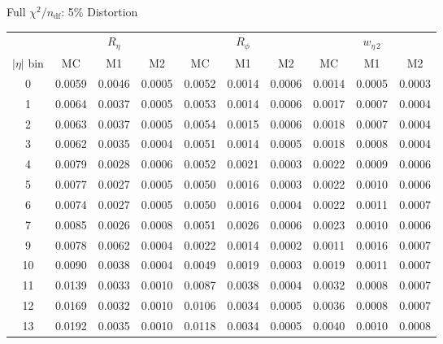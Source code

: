 \documentclass[aspectratio=169,10pt]{beamer}
\begin{document}
\begin{frame}[noframenumbering]{Full $\chi^2/n_\text{df}$: 5\% Distortion}
\centering
\scriptsize
\begin{tabular}{
  c
  c@{\hskip 4pt}c@{\hskip 4pt}c
  c@{\hskip 4pt}c@{\hskip 4pt}c
  c@{\hskip 4pt}c@{\hskip 4pt}c
}
\toprule
& \multicolumn{3}{c}{$R_\eta$}
& \multicolumn{3}{c}{$R_\phi$}
& \multicolumn{3}{c}{$w_{\eta\,2}$} \\
\cmidrule(lr){2-4}\cmidrule(lr){5-7}\cmidrule(lr){8-10}
{$|\eta|$ bin} & {MC} & {M1} & {M2} & {MC} & {M1} & {M2} & {MC} & {M1} & {M2} \\
\midrule
0  & 0.0059 & 0.0046 & 0.0005 & 0.0052 & 0.0014 & 0.0006 & 0.0014 & 0.0005 & 0.0003 \\
1  & 0.0064 & 0.0037 & 0.0005 & 0.0053 & 0.0014 & 0.0006 & 0.0017 & 0.0007 & 0.0004 \\
2  & 0.0063 & 0.0037 & 0.0005 & 0.0054 & 0.0015 & 0.0006 & 0.0018 & 0.0007 & 0.0004 \\
3  & 0.0062 & 0.0035 & 0.0004 & 0.0051 & 0.0014 & 0.0005 & 0.0018 & 0.0008 & 0.0004 \\
4  & 0.0079 & 0.0028 & 0.0006 & 0.0052 & 0.0021 & 0.0003 & 0.0022 & 0.0009 & 0.0006 \\
5  & 0.0077 & 0.0027 & 0.0005 & 0.0050 & 0.0016 & 0.0003 & 0.0022 & 0.0010 & 0.0006 \\
6  & 0.0074 & 0.0027 & 0.0005 & 0.0050 & 0.0016 & 0.0004 & 0.0022 & 0.0011 & 0.0007 \\
7  & 0.0085 & 0.0026 & 0.0008 & 0.0051 & 0.0026 & 0.0006 & 0.0023 & 0.0010 & 0.0006 \\
9  & 0.0078 & 0.0062 & 0.0004 & 0.0022 & 0.0014 & 0.0002 & 0.0011 & 0.0016 & 0.0007 \\
10 & 0.0090 & 0.0038 & 0.0004 & 0.0049 & 0.0019 & 0.0003 & 0.0019 & 0.0011 & 0.0007 \\
11 & 0.0139 & 0.0033 & 0.0010 & 0.0087 & 0.0038 & 0.0004 & 0.0032 & 0.0008 & 0.0007 \\
12 & 0.0169 & 0.0032 & 0.0010 & 0.0106 & 0.0034 & 0.0005 & 0.0036 & 0.0008 & 0.0007 \\
13 & 0.0192 & 0.0035 & 0.0010 & 0.0118 & 0.0034 & 0.0005 & 0.0040 & 0.0010 & 0.0008 \\
\bottomrule
\end{tabular}
\end{frame}
\end{document}
